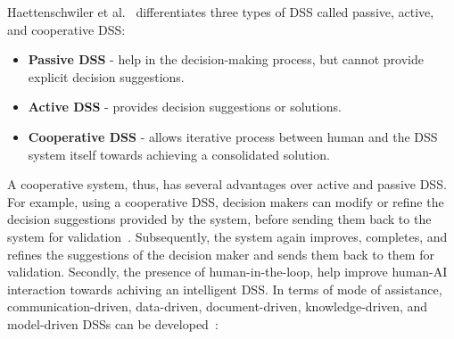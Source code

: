 Haettenschwiler et al.~\cite{haettenschwiler1999neues} differentiates three types of DSS called passive, active, and cooperative DSS:  

\vspace{-2mm}
\begin{itemize}[noitemsep]
    \item \textbf{Passive DSS} - help in the decision-making process, but cannot provide explicit decision suggestions.
    \item \textbf{Active DSS} - provides decision suggestions or solutions. 
    \item \textbf{Cooperative DSS} - allows iterative process between human and the DSS system itself towards achieving a consolidated solution.
\end{itemize}
\vspace{-2mm}

\hspace*{3.5mm} A cooperative system, thus, has several advantages over active and passive DSS. For example, using a cooperative DSS, decision makers can modify or refine the decision suggestions provided by the system, before sending them back to the system for validation~\cite{hackathorn1981organizational}. Subsequently, the system again improves, completes, and refines the suggestions of the decision maker and sends them back to them for validation. Secondly, the presence of human-in-the-loop, help improve human-AI interaction towards achiving an intelligent DSS. In terms of mode of assistance, communication-driven, data-driven, document-driven, knowledge-driven, and model-driven DSSs can be developed~\cite{power2002decision}:

